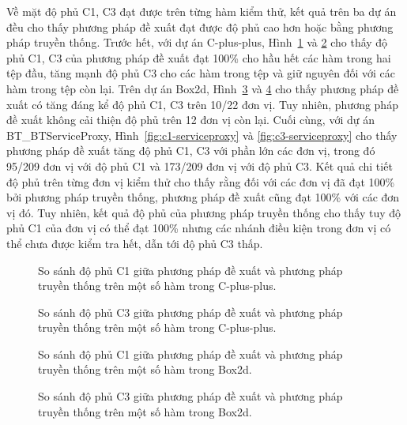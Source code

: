 Về mặt độ phủ C1, C3 đạt được trên từng hàm kiểm thử, kết quả trên ba dự án đều cho thấy phương pháp đề xuất đạt được độ phủ cao hơn hoặc bằng phương pháp truyền thống. Trước hết, với dự án C-plus-plus, Hình~\ref{fig:c1-algo} và \ref{fig:c3-algo} cho thấy độ phủ C1, C3 của phương pháp đề xuất đạt 100\% cho hầu hết các hàm trong hai tệp đầu, tăng mạnh độ phủ C3 cho các hàm trong tệp  và giữ nguyên đối với các hàm trong tệp còn lại. Trên dự án Box2d, Hình~\ref{fig:c1-box2d} và \ref{fig:c3-box2d} cho thấy phương pháp đề xuất có tăng đáng kể độ phủ C1, C3 trên 10/22 đơn vị. Tuy nhiên, phương pháp đề xuất không cải thiện độ phủ trên 12 đơn vị còn lại. Cuối cùng, với dự án BT\_BTServiceProxy, Hình~\ref{fig:c1-serviceproxy} và \ref{fig:c3-serviceproxy} cho thấy phương pháp đề xuất tăng độ phủ C1, C3 với phần lớn các đơn vị, trong đó 95/209 đơn vị với độ phủ C1 và 173/209 đơn vị với độ phủ C3. Kết quả chi tiết độ phủ trên từng đơn vị kiểm thử cho thấy rằng đối với các đơn vị đã đạt 100\% bởi phương pháp truyền thống, phương pháp đề xuất cũng đạt 100\% với các đơn vị đó. Tuy nhiên, kết quả độ phủ của phương pháp truyền thống cho thấy tuy độ phủ C1 của đơn vị có thể đạt 100\% nhưng các nhánh điều kiện trong đơn vị có thể chưa được kiểm tra hết, dẫn tới độ phủ C3 thấp. 

\begin{figure}[H]
    \centering
    
    \caption{So sánh độ phủ C1 giữa phương pháp đề xuất và phương pháp truyền thống trên một số hàm trong C-plus-plus.}
    \label{fig:c1-algo}
\end{figure}

\begin{figure}[H]
    \centering
    
    \caption{So sánh độ phủ C3 giữa phương pháp đề xuất và phương pháp truyền thống trên một số hàm trong C-plus-plus.}
    \label{fig:c3-algo}
\end{figure}

\begin{figure}[H]
	\centering
	
	\caption{So sánh độ phủ C1 giữa phương pháp đề xuất và phương pháp truyền thống trên một số hàm trong Box2d.}
	\label{fig:c1-box2d}
\end{figure}

\begin{figure}[H]
	\centering
	
	\caption{So sánh độ phủ C3 giữa phương pháp đề xuất và phương pháp truyền thống trên một số hàm trong Box2d.}
	\label{fig:c3-box2d}
\end{figure}


